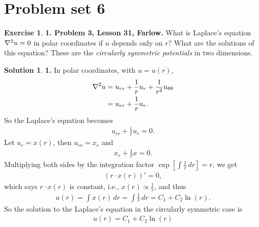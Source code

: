 \documentclass{book}
\theoremstyle{definition}
\newtheorem*{exer*}{Exercise}
\newtheorem*{sln*}{Solution}
\newcommand{\f}[2]{\frac{#1}{#2}}
\newcommand{\lb}{\left[}
\newcommand{\rb}{\right]}
\begin{document}
\newpage
\section{Problem set 6}


\begin{exer*}\textbf{1. Problem 3, Lesson 31, Farlow.} What is Laplace's equation $\laplacian u = 0$ in polar coordinates if $u$ depends only on $r$? What are the solutions of this equation? These are the \textit{circularly symmetric potentials} in two dimensions.
	
	\begin{sln*}\textbf{1.}
		In polar coordinates, with $u = u(r)$,
		\begin{align*}
		\laplacian u &= u_{rr} + \f{1}{r}u_r + \f{1}{r^2}u_{\theta\theta}\\
		&= u_{rr} + \f{1}{r}u_r.
		\end{align*}
		So the Laplace's equation becomes
		\begin{align*}
		u_{rr} + \f{1}{r}u_r = 0.
		\end{align*}
		Let $u_r = x(r)$, then $u_{rr} = x_r$ and
		\begin{align*}
		x_r + \f{1}{r}x = 0.
		\end{align*}
		Multiplying both sides by the integration factor $\exp\lb \int \f{1}{r}\,dr \rb = r$, we get
		\begin{align*}
		(r\cdot x(r))' = 0,
		\end{align*}
		which says $r\cdot x(r)$ is constant, i.e., $x(r) \propto \f{1}{r}$, and thus
		\begin{align*}
		u(r) = \int x(r)\,dr = \int \f{1}{r}\,dr = C_1 + C_2 \ln(r).
		\end{align*}
		So the solution to the Laplace's equation in the circularly symmetric case is
		\begin{align*}
		\boxed{u(r) = C_1 + C_2 \ln(r)}
		\end{align*}
	\end{sln*}
\end{exer*}




\newpage
\end{document}
